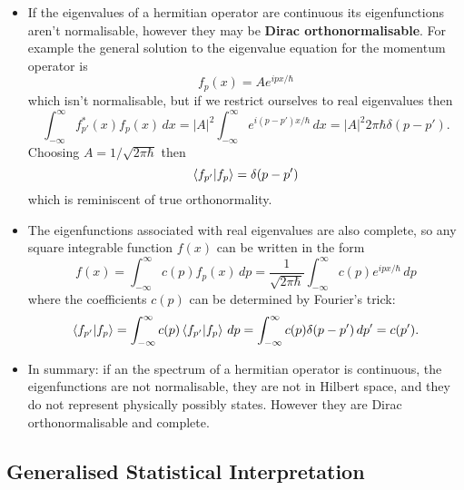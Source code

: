 \documentclass{article}
\begin{document}
\begin{itemize}
  \item If the eigenvalues of a hermitian operator are continuous its eigenfunctions aren't normalisable, however they may be \textbf{Dirac orthonormalisable}. For example the general solution to the eigenvalue equation for the momentum operator is \[f_p(x) = A e^{i p x / \hbar}\] which isn't normalisable, but if we restrict ourselves to real eigenvalues then \[\int_{-\infty}^\infty f_{p'}^*(x) f_p(x) \,d x = |A|^2 \int_{-\infty}^\infty e^{i (p - p') x / \hbar} \,d x = |A|^2 2 \pi \hbar \delta(p - p').\] Choosing $A = 1 / \sqrt{2 \pi \hbar}$ then \[\braket{f_{p'} | f_p} = \delta(p - p')\] which is reminiscent of true orthonormality.

  \item The eigenfunctions associated with real eigenvalues are also complete, so any square integrable function $f(x)$ can be written in the form \[f(x) = \int_{-\infty}^\infty c(p) f_p(x) \,d p = \frac{1}{\sqrt{2 \pi \hbar}} \int_{-\infty}^\infty c(p) e^{i p x / \hbar} \,d p\] where the coefficients $c(p)$ can be determined by Fourier's trick: \[\braket{f_{p'} | f_p} = \int_{-\infty}^\infty c(p) \braket{f_{p'} | f_p} \,d p = \int_{-\infty}^\infty c(p) \delta(p - p') \,d p' = c(p').\]

  \item In summary: if an the spectrum of a hermitian operator is continuous, the eigenfunctions are not normalisable, they are not in Hilbert space, and they do not represent physically possibly states. However they are Dirac orthonormalisable and complete.
\end{itemize}

\subsection{Generalised Statistical Interpretation}
\end{document}
